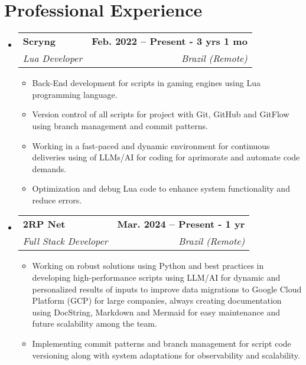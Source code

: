 \documentclass[letterpaper,11pt]{article}
\makeatletter
\newcommand{\resumeItem}[1]{
  \item\small{
    {#1 \vspace{-2pt}}
  }
}
\newcommand{\resumeSubheading}[4]{
  \vspace{-2pt}\item
    \begin{tabular*}{1.0\textwidth}[t]{l@{\extracolsep{\fill}}r}
      \textbf{#1} & \textbf{\small #2} \\
      \textit{\small#3} & \textit{\small #4} \\
    \end{tabular*}\vspace{-7pt}
}
\newcommand{\resumeSubHeadingListStart}{\begin{itemize}[leftmargin=0.0in, label={}]}
\newcommand{\resumeSubHeadingListEnd}{\end{itemize}}
\newcommand{\resumeItemListStart}{\begin{itemize}}
\newcommand{\resumeItemListEnd}{\end{itemize}\vspace{-5pt}}
\makeatother
\begin{document}
\section{Professional Experience}
  \resumeSubHeadingListStart

    \resumeSubheading
      {Scryng}{Feb. 2022 -- Present - 3 yrs 1 mo}
      {Lua Developer}{Brazil (Remote)}
      \resumeItemListStart
      \resumeItem{Back-End development for scripts in gaming engines using Lua programming language.}
        \resumeItem{Version control of all scripts for project with Git, GitHub and GitFlow using branch management and commit patterns.}
        \resumeItem{Working in a fast-paced and dynamic environment for continuous deliveries using of LLMs/AI for coding for aprimorate and automate code demands.}
        \resumeItem{Optimization and debug Lua code to enhance system functionality and reduce errors.}
      \resumeItemListEnd

    \resumeSubheading
      {2RP Net}{Mar. 2024 -- Present - 1 yr}
      {Full Stack Developer}{Brazil (Remote)}
      \resumeItemListStart
        \resumeItem{Working on robust solutions using Python and best practices in developing high-performance scripts using LLM/AI for dynamic and personalized results of inputs to improve data migrations to Google Cloud Platform (GCP) for large companies, always creating documentation using DocString, Markdown and Mermaid for easy maintenance and future scalability among the team.}
        \resumeItem{Implementing commit patterns and branch management for script code versioning along with system adaptations for observability and scalability.}
      \resumeItemListEnd

  \resumeSubHeadingListEnd
\vspace{-16pt}

\end{document}
